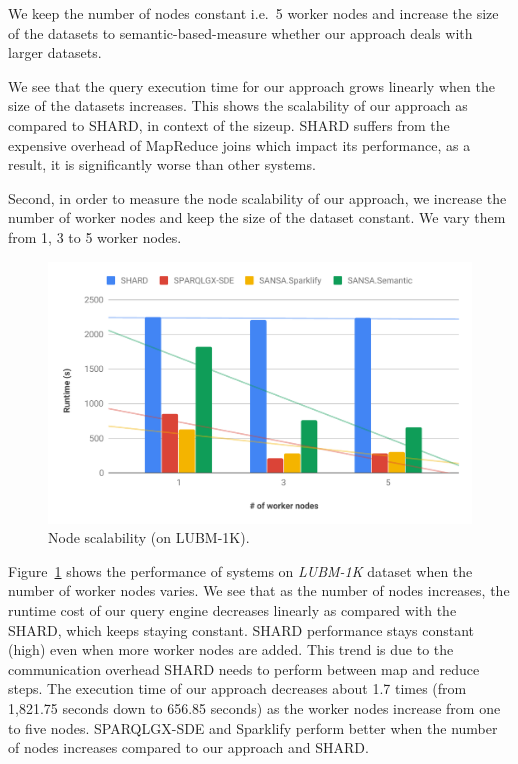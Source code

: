 We keep the number of nodes constant i.e.\ 5 worker nodes and increase the size of the datasets to semantic-based-measure whether our approach deals with larger datasets.

We see that the query execution time for our approach grows linearly when the size of the datasets increases.
This shows the scalability of our approach as compared to SHARD, in context of the sizeup.
SHARD suffers from the expensive overhead of MapReduce joins which impact its performance, as a result, it is significantly worse than other systems.

Second, in order to measure the node scalability of our approach, we increase the number of worker nodes and keep the size of the dataset constant.
We vary them from 1, 3 to 5 worker nodes.

\begin{figure}
  \includegraphics[width=1.0\columnwidth]{images/6_scalable_rdf_querying/semantic-based-node-scalability.pdf}
    \caption{Node scalability (on LUBM-1K).}
    \label{fig:semantic-based-node-scalability}
\end{figure}

Figure~\ref{fig:semantic-based-node-scalability} shows the performance of systems on \textit{LUBM-1K} dataset when the number of worker nodes varies.
We see that as the number of nodes increases, the runtime cost of our query engine decreases linearly as compared with the SHARD, which keeps staying constant.
SHARD performance stays constant (high) even when more worker nodes are added.
This trend is due to the communication overhead SHARD needs to perform between map and reduce steps.
The execution time of our approach decreases about 1.7 times (from 1,821.75 seconds down to 656.85 seconds) as the worker nodes increase from one to five nodes.
SPARQLGX-SDE and Sparklify perform better when the number of nodes increases compared to our approach and SHARD. 

